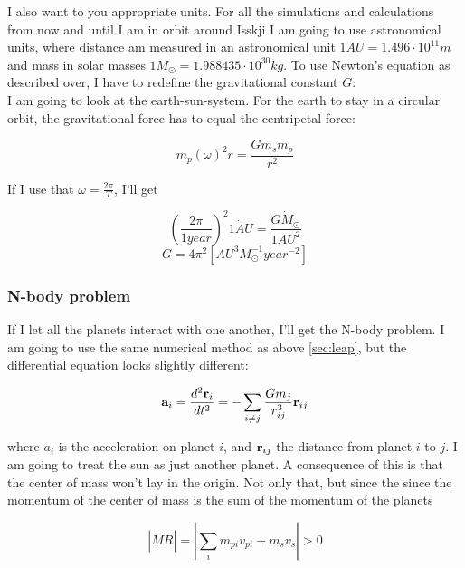 \documentclass[a4paper, 10pt]{article}
\begin{document}
I also want to you appropriate units. For all the simulations and calculations from now and until I am in orbit around Isskji I am going to use astronomical units, where distance am measured in an astronomical unit $1 AU = 1.496 \cdot 10^{11} m$ and mass in solar masses $1 M_{\odot} = 1.988435 \cdot 10^{30} kg$. To use Newton's equation as described over, I have to redefine the gravitational constant $G$: \\

I am going to look at the earth-sun-system. For the earth to stay in a circular orbit, the gravitational force has to equal the centripetal force:

\begin{equation}
m_p(\omega)^{2}r = \frac{Gm_sm_p}{r^{2}}
\end{equation}

If I use that $\omega = \frac{2 \pi}{T}$, I'll get

\begin{equation}
\left( \frac{2 \pi}{1 year} \right)^{2} \dot {1 AU} = \frac{G \dot M_{\odot}}{1AU^{2}} 
\end{equation}
\begin{equation}
G = 4 \pi^{2}[AU^{3} M_{\odot}^{-1} year^{-2}]
\end{equation}

\subsubsection{N-body problem}
If I let all the planets interact with one another, I'll get the N-body problem. I am going to use the same numerical method as above \ref{sec:leap}, but the differential equation looks slightly different:

\begin{align}
\bold{a}_i = \frac{d^{2}\textbf{r}_i}{dt^{2}}  = -\sum_{i \neq j}\frac{G m_j}{r_{ij}^{3}}\textbf{r}_{ij}
\end{align}

where $a_i$ is the acceleration on planet $i$, and $\bold{r}_{ij}$ the distance from planet $i$ to $j$. I am going to treat the sun as just another planet. A consequence of this is that the center of mass won't lay in the origin. Not only that, but since the since the momentum of the center of mass is the sum of the momentum of the planets 

\begin{equation}
|M\dot{R}| = |\sum\limits_i m_{pi}v_{pi} + m_sv_s| > 0 
\end{equation}
\end{document}
